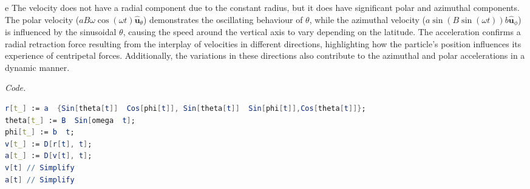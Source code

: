 \begin{solution}{6.4}{e}
    The velocity does not have a radial component due to the constant radius, but it does have significant polar and azimuthal components. The polar velocity (\(a B \omega \cos(\omega t) \hat{\mathbf{u}}_\theta\)) demonstrates the oscillating behaviour of \(\theta\), while the azimuthal velocity (\(a \sin(B \sin(\omega t)) b \hat{\mathbf{u}}_\phi\)) is influenced by the sinusoidal \(\theta\), causing the speed around the vertical axis to vary depending on the latitude. The acceleration confirms a radial retraction force resulting from the interplay of velocities in different directions, highlighting how the particle's position influences its experience of centripetal forces. Additionally, the variations in these directions also contribute to the azimuthal and polar accelerations in a dynamic manner.

    \textit{Code.}
\begin{lstlisting}[language=Mathematica,style=Mathematica,caption={For a particle described by spherical coordinates with a constant radial distance \(a\), a sinusoidally varying polar angle \(\theta = B \sin(\omega t)\), and a linearly increasing azimuthal angle \(\phi = bt\).}]
r[t_] := a  {Sin[theta[t]]  Cos[phi[t]], Sin[theta[t]]  Sin[phi[t]],Cos[theta[t]]};
theta[t_] := B  Sin[omega  t];
phi[t_] := b  t;
v[t_] := D[r[t], t];
a[t_] := D[v[t], t];
v[t] // Simplify
a[t] // Simplify
\end{lstlisting}
\end{solution}

